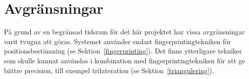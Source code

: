 \documentclass[a4paper,12pt]{article}
\begin{document}



 \section{Avgränsningar}
 På grund av en begränsad tidsram för det här projektet har vissa avgränsningar varit tvugna att göras. Systemet använder endast fingerprintingtekniken för positionsbestämning (se Sektion~\ref{fingerprinting}). Det finns ytterligare tekniker som skulle kunnat användas i kombination med fingerprintingtekniken för att ge bättre precision, till exempel trilateration (se Sektion~\ref{triangulering}).
\end{document}
